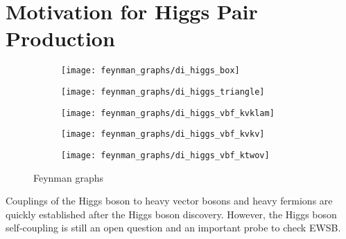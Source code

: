 \section{Motivation for Higgs Pair Production}%
\label{sec:hh_motivation}


\begin{figure}[htbp]
  \centering


  \begin{subfigure}{0.49\textwidth}
    \centering
    \texttt{[image: feynman\_graphs/di\_higgs\_box]}
    \subcaption{}
  \end{subfigure}\hfill%
  \begin{subfigure}{0.49\textwidth}
    \centering
    \texttt{[image: feynman\_graphs/di\_higgs\_triangle]}
    \subcaption{}
  \end{subfigure}

  \vspace*{1em}

  \begin{subfigure}{0.33\textwidth}
    \centering
    \texttt{[image: feynman\_graphs/di\_higgs\_vbf\_kvklam]}
    \subcaption{}
  \end{subfigure}\hfill%
  \begin{subfigure}{0.33\textwidth}
    \centering
    \texttt{[image: feynman\_graphs/di\_higgs\_vbf\_kvkv]}
    \subcaption{}
  \end{subfigure}\hfill%
  \begin{subfigure}{0.33\textwidth}
    \centering
    \texttt{[image: feynman\_graphs/di\_higgs\_vbf\_ktwov]}
    \subcaption{}
  \end{subfigure}

  \caption{Feynman graphs}
  \label{fig:hh_feynmans}
\end{figure}


Couplings of the Higgs boson to heavy vector bosons and heavy fermions
are quickly established after the Higgs boson discovery. However, the
Higgs boson self-coupling is still an open question and an important
probe to check EWSB.


